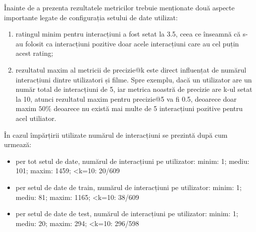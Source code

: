 Înainte de a prezenta rezultatele metricilor trebuie menționate două aspecte importante legate de configurația setului de date utilizat:
\begin{enumerate}
	\item ratingul minim pentru interacțiuni a fost setat la 3.5, ceea ce înseamnă că s-au folosit ca interacțiuni pozitive doar acele interacțiuni care au cel puțin acest rating;
	\item rezultatul maxim al metricii de precizie@k este direct influențat de numărul interacțiuni dintre utilizatori și filme. Spre exemplu, dacă un utilizator are un număr total de interacțiuni de 5, iar metrica noastră de precizie are k-ul setat la 10, atunci rezultatul maxim pentru precizie@5 va fi 0.5, deoarece doar maxim $50\%$ deoarece nu există mai multe de 5 interacțiuni pozitive pentru acel utiliator.
\end{enumerate}

În cazul împărțirii utilizate numărul de interacțiuni se prezintă după cum urmează:
\begin{itemize}
	\item per tot setul de date, numărul de interacțiuni pe utilizator: minim: 1; mediu: 101; maxim: 1459; <k=10: 20/609 
	\item per setul de date de train, numărul de interacțiuni pe utilizator: minim: 1; mediu: 81; maxim: 1165; <k=10: 38/609
	\item per setul de date de test, numărul de interacțiuni pe utilizator: minim: 1; mediu: 20; maxim: 294; <k=10: 296/598
\end{itemize}

